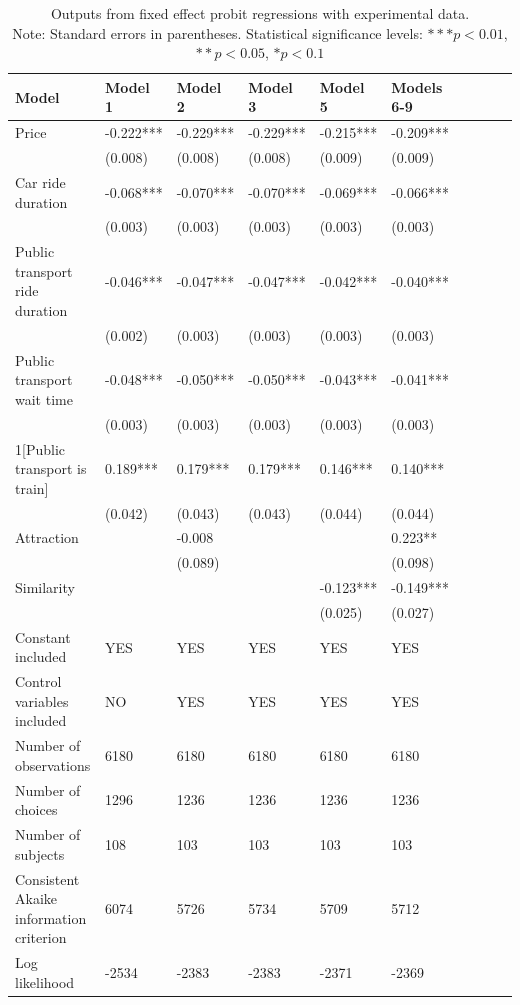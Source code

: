 \documentclass[a4paper,12pt]{article}
\begin{document}
\clearpage
\newpage
\clearpage
\begin{table}
    \centering
    \scriptsize
    \begin{tabular}{p{5.3cm}*{9}{p{1.5cm}}}
    \toprule
    Model & Model 1 & Model 2 & Model 3 & Model 5 & Models 6-9 \\
    \midrule
    Price & -0.222*** & -0.229*** & -0.229*** & -0.215*** & -0.209*** \\
     & (0.008) & (0.008) & (0.008) & (0.009) & (0.009) \\
    Car ride duration & -0.068*** & -0.070*** & -0.070*** & -0.069*** & -0.066*** \\
     & (0.003) & (0.003) & (0.003) & (0.003) & (0.003) \\
    Public transport ride duration & -0.046*** & -0.047*** & -0.047*** & -0.042*** & -0.040*** \\
     & (0.002) & (0.003) & (0.003) & (0.003) & (0.003) \\
    Public transport wait time & -0.048*** & -0.050*** & -0.050*** & -0.043*** & -0.041*** \\
     & (0.003) & (0.003) & (0.003) & (0.003) & (0.003) \\
    1[Public transport is train] & 0.189*** & 0.179*** & 0.179*** & 0.146*** & 0.140*** \\
     & (0.042) & (0.043) & (0.043) & (0.044) & (0.044) \\
    Attraction & & -0.008 & & & 0.223** \\
     & & (0.089) & & & (0.098) \\
    Similarity & & & & -0.123*** & -0.149*** \\
     & & & & (0.025) & (0.027) \\
    Constant included & YES & YES & YES & YES & YES \\
    Control variables included & NO & YES & YES & YES & YES \\
    Number of observations & 6180 & 6180 & 6180 & 6180 & 6180 \\
    Number of choices & 1296 & 1236 & 1236 & 1236 & 1236 \\
    Number of subjects & 108 & 103 & 103 & 103 & 103 \\
    Consistent Akaike information criterion & 6074 & 5726 & 5734 & 5709 & 5712 \\
    Log likelihood & -2534 & -2383 & -2383 & -2371 & -2369 \\

    \bottomrule
    \end{tabular}
    \caption{Outputs from fixed effect probit regressions with experimental data.\\ Note: Standard errors in parentheses. Statistical significance levels: $*** p<0.01$, $** p<0.05$, $* p<0.1$}
    \label{tab:fixedProbitExperimentalData}
\end{table}
\clearpage
\newpage
\end{document}
